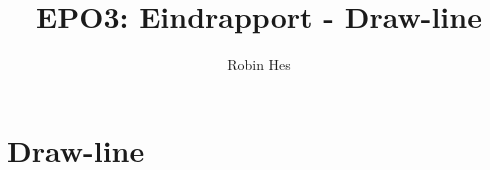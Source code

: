 \documentclass{scrartcl} %
\author{Robin Hes}
\title{EPO3: Eindrapport - Draw-line}
\begin{document}
\section{Draw-line}
\label{sec:draw-line}
\end{document}
